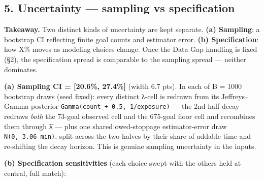 \documentclass[
]{article}
\begin{document}
\subsection{5. Uncertainty --- sampling vs
specification}\label{uncertainty-sampling-vs-specification}

\textbf{Takeaway.} Two distinct kinds of uncertainty are kept separate.
\textbf{(a) Sampling}: a bootstrap CI reflecting finite goal counts and
estimator error. \textbf{(b) Specification}: how X\% moves as modeling
choices change. Once the Data Gap handling is fixed (§2), the
specification spread is comparable to the sampling spread --- neither
dominates.

\textbf{(a) Sampling CI = {[}20.6\%, 27.4\%{]}} (width 6.7 pts). In each
of B = 1000 bootstrap draws (seed fixed): every distinct λ-cell is
redrawn from its Jeffreys--Gamma posterior
\texttt{Gamma(count\ +\ 0.5,\ 1/exposure)} --- the 2nd-half decay
redraws \emph{both} the 73-goal observed cell and the 675-goal floor
cell and recombines them through λ̄ --- plus one shared owed-stoppage
estimator-error draw \texttt{N(0,\ 3.06\ min)}, split across the two
halves by their share of addable time and re-shifting the decay horizon.
This is genuine sampling uncertainty in the inputs.

\textbf{(b) Specification sensitivities} (each choice swept with the
others held at central, full match):
\end{document}
